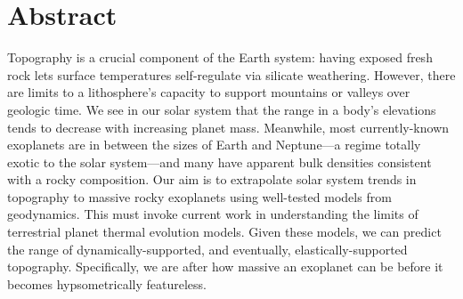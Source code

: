 \section*{Abstract}

Topography is a crucial component of the Earth system: having exposed fresh rock lets surface temperatures self-regulate via silicate weathering. However, there are limits to a lithosphere’s capacity to support mountains or valleys over geologic time. We see in our solar system that the range in a body’s elevations tends to decrease with increasing planet mass. Meanwhile, most currently-known exoplanets are in between the sizes of Earth and Neptune---a regime totally exotic to the solar system---and many have apparent bulk densities consistent with a rocky composition. Our aim is to extrapolate solar system trends in topography to massive rocky exoplanets using well-tested models from geodynamics. This must invoke current work in understanding the limits of terrestrial planet thermal evolution models. Given these models, we can predict the range of dynamically-supported, and eventually, elastically-supported topography. Specifically, we are after how massive an exoplanet can be before it becomes hypsometrically featureless.